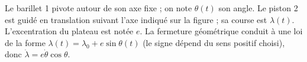 \begin{corrigebox}
Le barillet 1 pivote autour de son axe fixe ; on note $\theta(t)$ son angle.
Le piston 2 est guidé en translation suivant l'axe indiqué sur la figure ; sa
course est $\lambda(t)$. L'excentration du plateau est notée $e$. La fermeture
géométrique conduit à une loi de la forme
$\lambda(t)=\lambda_0+e\sin\theta(t)$ (le signe dépend du sens positif choisi),
donc $\dot\lambda=e\dot\theta\cos\theta$.
\end{corrigebox}
